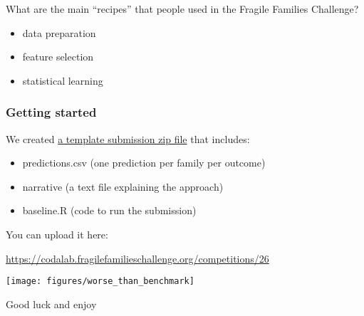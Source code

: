 \documentclass{beamer}
\begin{document}
\begin{frame}

What are the main ``recipes'' that people used in the Fragile Families Challenge?
\begin{itemize}
\item data preparation
\item feature selection
\item statistical learning
\end{itemize}

\end{frame}
\begin{frame}
\frametitle{Getting started}

We created \href{https://github.com/compsocialscience/summer-institute/blob/master/2020/materials/day5-mass-collaboration/activity/submission.zip}{a template submission zip file} that includes:
\begin{itemize}
\item predictions.csv (one prediction per family per outcome)
\item narrative (a text file explaining the approach)
\item baseline.R (code to run the submission)
\end{itemize} 

\vfill
You can upload it here:
\large{
\begin{center}
\textcolor{blue}{\href{https://codalab.fragilefamilieschallenge.org/competitions/26}{https://codalab.fragilefamilieschallenge.org/competitions/26}}
\end{center}
}

\end{frame}
\begin{frame}

\begin{center}
\texttt{[image: figures/worse\_than\_benchmark]}
\end{center}

\end{frame}
\begin{frame}

\begin{center}
\LARGE Good luck and enjoy
\end{center}

\end{frame}
\end{document}
